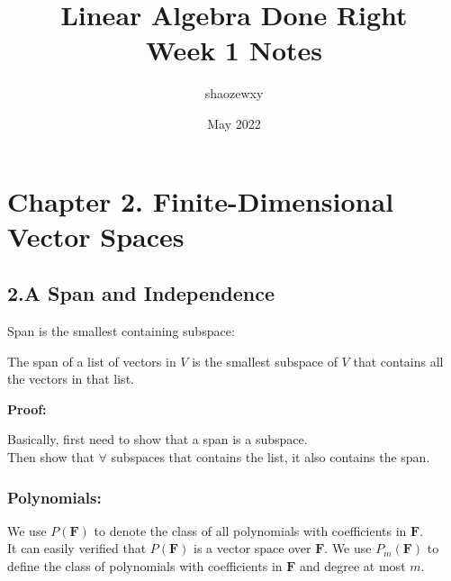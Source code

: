 \documentclass{article}
\title{Linear Algebra Done Right\\
\large{Week 1 Notes}}
\author{shaozewxy }
\date{May 2022}
\begin{document}
\maketitle

\setcounter{secnumdepth}{0}
\section{Chapter 2. Finite-Dimensional Vector Spaces}
\subsection{2.A Span and Independence}
Span is the smallest containing subspace:\\
\begin{addmargin}[1em]{0em}
    The span of a list of vectors in $V$ is the smallest subspace of $V$ that contains all the vectors in that list.
\end{addmargin}
\textbf{Proof:}\\
\begin{addmargin}[1em]{0em}
    Basically, first need to show that a span is a subspace.\\
    Then show that $\forall$ subspaces that contains the list, it also contains the span.\\
\end{addmargin}
\subsubsection{Polynomials:}
We use $P(\textbf{F})$ to denote the class of all polynomials with coefficients in $\textbf{F}$.\\
It can easily verified that $P(\textbf{F})$ is a vector space over $\textbf{F}$.
We use $P_m(\textbf{F})$ to define the class of polynomials with coefficients in $\textbf{F}$ and degree at most $m$.\\
\end{document}
